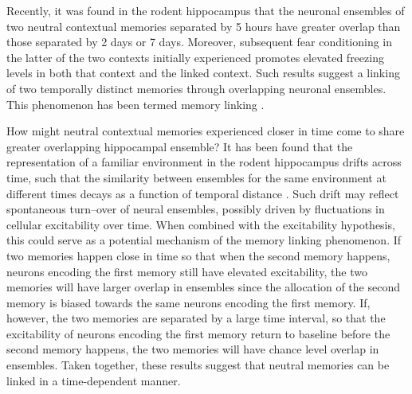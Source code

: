 \documentclass[master.tex]{subfiles}
\begin{document}
Recently, it was found in the rodent hippocampus that the neuronal ensembles of
two neutral contextual memories separated by 5 hours have greater overlap than
those separated by 2 days or 7 days. Moreover, subsequent fear conditioning in
the latter of the two contexts initially experienced promotes elevated freezing
levels in both that context and the linked context. Such results suggest a
linking of two temporally distinct memories through overlapping neuronal
ensembles. This phenomenon has been termed memory linking
\cite{cai_shared_2016}.

How might neutral contextual memories experienced closer in time come to share
greater overlapping hippocampal ensemble? It has been found that the
representation of a familiar environment in the rodent hippocampus drifts across
time, such that the similarity between ensembles for the same environment at
different times decays as a function of temporal distance
\cite{mankin_neuronal_2012, ziv_long-term_2013-1}. Such drift may reflect
spontaneous turn--over of neural ensembles, possibly driven by fluctuations in
cellular excitability over time. When combined with the excitability hypothesis,
this could serve as a potential mechanism of the memory linking phenomenon. If
two memories happen close in time so that when the second memory happens,
neurons encoding the first memory still have elevated excitability, the two
memories will have larger overlap in ensembles since the allocation of the
second memory is biased towards the same neurons encoding the first memory. If,
however, the two memories are separated by a large time interval, so that the
excitability of neurons encoding the first memory return to baseline before the
second memory happens, the two memories will have chance level overlap in
ensembles. Taken together, these results suggest that neutral memories can be
linked in a time-dependent manner.
\end{document}
